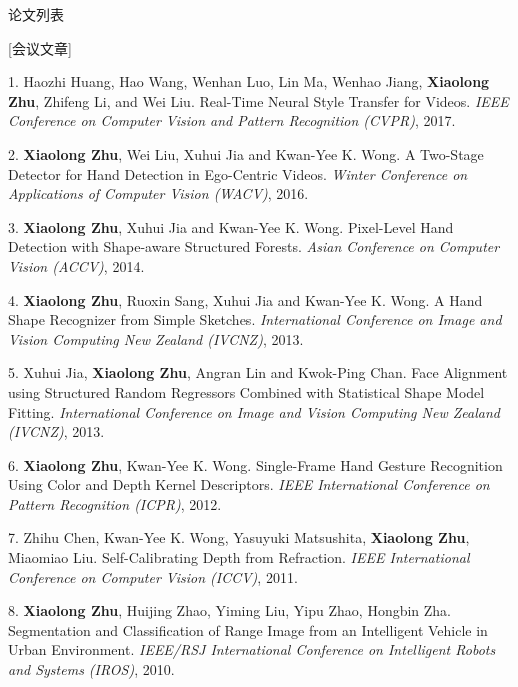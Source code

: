 \documentclass[UTF8]{cv_professional-cn} %
\makeatletter
\newlength{\bibhang}
\newlength{\bibsep}
 {\@listi \global\bibsep\itemsep \global\advance\bibsep by\parsep}
\newenvironment{bibsection}%
        {\vspace{\itemsep}\begin{list}{}{%
       \setlength{\leftmargin}{\bibhang}%
       \setlength{\itemsep}{\bibsep}%
       \setlength{\parsep}{\z@}%
        \setlength{\partopsep}{0pt}%
        \setlength{\topsep}{0pt}}}
        {\end{list}\vspace{\itemsep}}
\makeatother
\begin{document}

\begin{rSection}{论文列表}

[会议文章]

\begin{bibsection}
  \item[1.] Haozhi Huang, Hao Wang, Wenhan Luo, Lin Ma, Wenhao Jiang, \textbf{Xiaolong Zhu}, Zhifeng Li, and Wei Liu. Real-Time Neural Style Transfer for Videos. \emph{IEEE Conference on Computer Vision and Pattern Recognition (CVPR)}, 2017.

	\item[2.] \textbf{Xiaolong Zhu}, Wei Liu, Xuhui Jia and Kwan-Yee K. Wong. A Two-Stage Detector for Hand Detection in Ego-Centric Videos. \emph{Winter Conference on Applications of Computer Vision (WACV)}, 2016.

	\item[3.] \textbf{Xiaolong Zhu}, Xuhui Jia and Kwan-Yee K. Wong. Pixel-Level Hand Detection with Shape-aware Structured Forests. \emph{Asian Conference on Computer Vision (ACCV)}, 2014.

	\item[4.] \textbf{Xiaolong Zhu}, Ruoxin Sang, Xuhui Jia and Kwan-Yee K. Wong. A Hand Shape Recognizer from Simple Sketches. \emph{International Conference on Image and Vision Computing New Zealand (IVCNZ)}, 2013.

	\item[5.] Xuhui Jia, \textbf{Xiaolong Zhu}, Angran Lin and Kwok-Ping Chan. Face Alignment using Structured Random Regressors Combined with Statistical Shape Model Fitting. \emph{International Conference on Image and Vision Computing New Zealand (IVCNZ)}, 2013.

	\item[6.] \textbf{Xiaolong Zhu}, Kwan-Yee K. Wong. Single-Frame Hand Gesture Recognition Using Color and Depth Kernel Descriptors. \emph{IEEE International Conference on Pattern Recognition (ICPR)}, 2012.

	\item[7.] Zhihu Chen, Kwan-Yee K. Wong, Yasuyuki Matsushita, \textbf{Xiaolong Zhu}, Miaomiao Liu. Self-Calibrating Depth from Refraction. \emph{IEEE International Conference on Computer Vision (ICCV)}, 2011.

	\item[8.] \textbf{Xiaolong Zhu}, Huijing Zhao, Yiming Liu, Yipu Zhao, Hongbin Zha. Segmentation and Classification of Range Image from an Intelligent Vehicle in Urban Environment. \emph{IEEE/RSJ International Conference on Intelligent Robots and Systems (IROS)}, 2010.


\end{bibsection}
\end{rSection}
\end{document}
